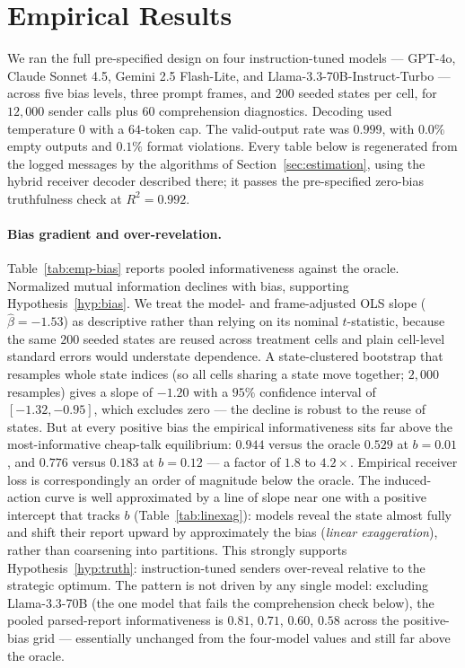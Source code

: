 \documentclass[11pt]{article}
\begin{document}
\section{Empirical Results}\label{sec:results-empirical}

We ran the full pre-specified design on four instruction-tuned models --- GPT-4o, Claude Sonnet 4.5, Gemini 2.5 Flash-Lite, and Llama-3.3-70B-Instruct-Turbo --- across five bias levels, three prompt frames, and $200$ seeded states per cell, for $12{,}000$ sender calls plus $60$ comprehension diagnostics.  Decoding used temperature $0$ with a $64$-token cap.  The valid-output rate was $0.999$, with $0.0\%$ empty outputs and $0.1\%$ format violations.  Every table below is regenerated from the logged messages by the algorithms of Section~\ref{sec:estimation}, using the hybrid receiver decoder described there; it passes the pre-specified zero-bias truthfulness check at $R^2=0.992$.

\paragraph{Bias gradient and over-revelation.}
Table~\ref{tab:emp-bias} reports pooled informativeness against the oracle.  Normalized mutual information declines with bias, supporting Hypothesis~\ref{hyp:bias}.  We treat the model- and frame-adjusted OLS slope ($\widehat\beta=-1.53$) as descriptive rather than relying on its nominal $t$-statistic, because the same $200$ seeded states are reused across treatment cells and plain cell-level standard errors would understate dependence.  A state-clustered bootstrap that resamples whole state indices (so all cells sharing a state move together; $2{,}000$ resamples) gives a slope of $-1.20$ with a $95\%$ confidence interval of $[-1.32,-0.95]$, which excludes zero --- the decline is robust to the reuse of states.  But at every positive bias the empirical informativeness sits far above the most-informative cheap-talk equilibrium: $0.944$ versus the oracle $0.529$ at $b=0.01$, and $0.776$ versus $0.183$ at $b=0.12$ --- a factor of $1.8$ to $4.2\times$.  Empirical receiver loss is correspondingly an order of magnitude below the oracle.  The induced-action curve is well approximated by a line of slope near one with a positive intercept that tracks $b$ (Table~\ref{tab:linexag}): models reveal the state almost fully and shift their report upward by approximately the bias (\emph{linear exaggeration}), rather than coarsening into partitions.  This strongly supports Hypothesis~\ref{hyp:truth}: instruction-tuned senders over-reveal relative to the strategic optimum.  The pattern is not driven by any single model: excluding Llama-3.3-70B (the one model that fails the comprehension check below), the pooled parsed-report informativeness is $0.81$, $0.71$, $0.60$, $0.58$ across the positive-bias grid --- essentially unchanged from the four-model values and still far above the oracle.
\end{document}
